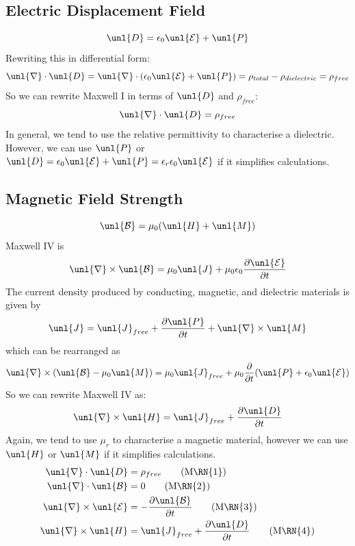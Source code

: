 \documentclass[a4paper, 11pt, normalem]{report}
\newcommand\p{\partial}
\newcommand\E{\mathcal{E}}
\newcommand\uE{\unl{\E}}
\newcommand\B{\mathcal{B}}
\newcommand\uB{\unl{\B}}
\newcommand\del{\unl{\nabla}}
\newcommand\eno{\epsilon_0}
\newcommand\J{\unl{J}}
\newcommand\er{\epsilon_r}
\begin{document}
\subsection{Electric Displacement Field}
\begin{equation}
	\unl{D} = \eno\uE + \unl{P}
\end{equation}
Rewriting this in differential form:
\begin{equation}
	\del\cdot\unl{D} = \del\cdot(\eno\uE+\unl{P}) = \rho_{total} - \rho_{dielectric} = \rho_{free}
\end{equation}
So we can rewrite Maxwell \RN{1} in terms of $\unl{D}$ and $\rho_{free}$:
\begin{equation}
	\del\cdot\unl{D} = \rho_{free}
\end{equation}
In general, we tend to use the relative permittivity to characterise a dielectric.
However, we can use $\unl{P}$ or $\unl{D} = \eno\uE + \unl{P} = \er\eno\uE$ if it simplifies calculations.

\subsection{Magnetic Field Strength}
\begin{equation}
	\uB = \mu_0(\unl{H}+\unl{M})
\end{equation}
Maxwell \RN{4} is
\begin{equation}
	\del\times\uB = \mu_0\J + \mu_0\eno\frac{\p \uE}{\p t}
\end{equation}
The current density produced by conducting, magnetic, and dielectric materials is given by
\begin{equation}
	\J = \J_{free} + \frac{\p\unl{P}}{\p t} + \del\times\unl{M}
\end{equation}
which can be rearranged as
\begin{equation}
	\del\times(\uB-\mu_0\unl{M}) = \mu_0\J_{free} + \mu_0\frac{\p}{\p t}(\unl{P} + \eno\uE)
\end{equation}
So we can rewrite Maxwell \RN{4} as:
\begin{equation}
	\del\times\unl{H} = \J_{free} + \frac{\p\unl{D}}{\p t}
\end{equation}
Again, we tend to use $\mu_r$ to characterise a magnetic material, however we can use $\unl{H}$ or $\unl{M}$ if it simplifies calculations.
\begin{align}
	\del\cdot\unl{D} &= \rho_{free} \tag{M\RN{1}} \\
	\del\cdot\uB &= 0 \tag{M\RN{2}} \\
	\del\times\uE &= -\frac{\p\uB}{\p t} \tag{M\RN{3}} \\
	\del\times\unl{H} &= \J_{free} + \frac{\p\unl{D}}{\p t} \tag{M\RN{4}}
\end{align}
\end{document}
